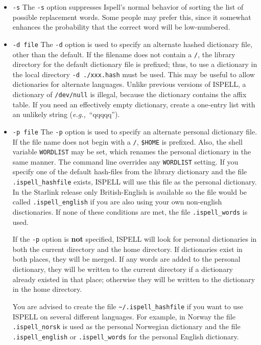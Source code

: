 \begin{itemize}
\item {\Large\tt -s}\sunspec{\\}{}
The \verb+-s+ option suppresses Ispell's normal behavior of sorting the list
of possible replacement words.
Some people may prefer this, since it somewhat enhances the probability that
the correct word will be low-numbered.

\item {\Large\tt -d file}\sunspec{\\}{}
The \verb+-d+ option is used to specify an alternate hashed dictionary file,
other than the default.
If the filename does not contain a \verb+/+, the library directory for the
default dictionary file is prefixed; thus, to use a dictionary in the local
directory \verb+-d ./xxx.hash+ must be used.
This may be useful to allow dictionaries for alternate languages.
Unlike previous versions of ISPELL, a dictionary of \verb+/dev/null+ is illegal,
because the dictionary contains the affix table.
If you need an effectively empty dictionary, create a one-entry list with an
unlikely string ({\it{e.g.,}}~``qqqqq'').

\item {\Large\tt -p file}\sunspec{\\}{}
The \verb+-p+ option is used to specify an alternate personal dictionary file.
If the file name does not begin with a \verb+/+, \verb+$HOME+ is prefixed.
Also, the shell variable \verb+WORDLIST+ may be set, which renames the personal
dictionary in the same manner.
The command line overrides any \verb+WORDLIST+ setting.
If you specify one of the default hash-files from the library dictionary and the
file \verb+.ispell_hashfile+ exists, ISPELL will use this file as the personal
dictionary.
In the Starlink release only British-English is available so the file would be
called \verb+.ispell_english+ if you are also using your own non-english
disctionaries.
If none of these conditions are met, the file \verb+.ispell_words+ is used.

If the \verb+-p+ option is {\bf not} specified, ISPELL will look for personal
dictionaries in both the current directory and the home directory.
If dictionaries exist in both places, they will be merged.
If any words are added to the personal dictionary, they will be written to the
current directory if a dictionary already existed in that place; otherwise they
will be written to the dictionary in the home directory.

You are advised to create the file \verb+~/.ispell_hashfile+ if you want to use
ISPELL on several different languages.
For example, in Norway the file \verb+.ispell_norsk+ is used as the personal
Norwegian dictionary and the file \verb+.ispell_english+ or
\verb+.ispell_words+ for the personal English dictionary.


\end{itemize}
